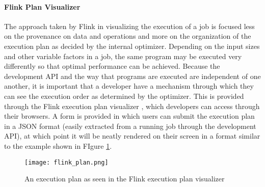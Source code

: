 \paragraph{Flink Plan Visualizer}
The approach taken by Flink in visualizing the execution of a job is focused less on the provenance on data and operations and more on the organization of the execution plan as decided by the internal optimizer. Depending on the input sizes and other variable factors in a job, the same program may be executed very differently so that optimal performance can be achieved. Because the development API and the way that programs are executed are independent of one another, it is important that a developer have a mechanism through which they can see the execution order as determined by the optimizer. This is provided through the Flink execution plan visualizer \cite{ApacheSoftwareFoundation2014}, which developers can access through their browsers. A form is provided in which users can submit the execution plan in a JSON format (easily extracted from a running job through the development API), at which point it will be neatly rendered on their screen in a format similar to the example shown in FIgure \ref{fig:flinkplan}.

\begin{figure}
	\centering
	\texttt{[image: flink\_plan.png]}
	\caption{An execution plan as seen in the Flink execution plan visualizer	\cite{ApacheSoftwareFoundation2014}}
	\label{fig:flinkplan}	
\end{figure}


